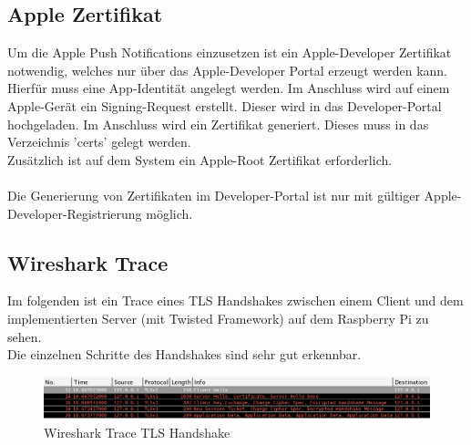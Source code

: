 \subsection{Apple Zertifikat}
Um die Apple Push Notifications einzusetzen ist ein Apple-Developer Zertifikat notwendig, welches nur über das Apple-Developer Portal erzeugt werden kann. Hierfür muss eine App-Identität angelegt werden. Im Anschluss wird auf einem Apple-Gerät ein Signing-Request erstellt. Dieser wird in das Developer-Portal hochgeladen. Im Anschluss wird ein Zertifikat generiert. Dieses muss in das Verzeichnis 'certs' gelegt werden. \\
Zusätzlich ist auf dem System ein Apple-Root Zertifikat erforderlich.\\\\
Die Generierung von Zertifikaten im Developer-Portal ist nur mit gültiger Apple-Developer-Registrierung möglich.

\subsection{Wireshark Trace}
Im folgenden ist ein Trace eines TLS Handshakes zwischen einem Client und dem implementierten Server (mit Twisted Framework) auf dem Raspberry Pi zu sehen. \\
Die einzelnen Schritte des Handshakes sind sehr gut erkennbar.\\
\begin{figure}[h]
\begin{minipage}{\textwidth}
            \centering
            \includegraphics[width=\textwidth]{./data/wireshark.png}
            \caption{Wireshark Trace TLS Handshake}
        \end{minipage}
\end{figure}